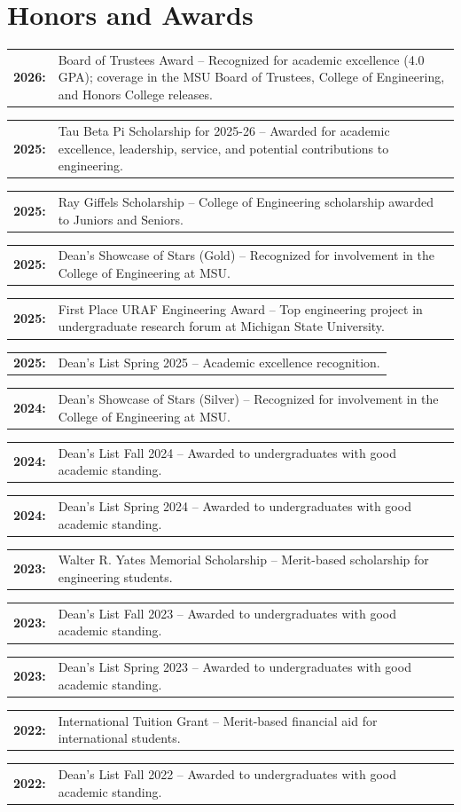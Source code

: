 \section{Honors and Awards}

\newcommand{\awardentry}[3]{%
    \begin{tabularx}{\textwidth}{@{}p{1.2cm}X@{}}
        \textbf{#1:} & #2 -- #3 \\
    \end{tabularx}
    \vspace{2pt}
}

\awardentry{2026}{Board of Trustees Award}{Recognized for academic excellence (4.0 GPA); coverage in the MSU Board of Trustees, College of Engineering, and Honors College releases.}
\awardentry{2025}{Tau Beta Pi Scholarship for 2025-26}{Awarded for academic excellence, leadership, service, and potential contributions to engineering.}
\awardentry{2025}{Ray Giffels Scholarship}{College of Engineering scholarship awarded to Juniors and Seniors.}
\awardentry{2025}{Dean's Showcase of Stars (Gold)}{Recognized for involvement in the College of Engineering at MSU.}
\awardentry{2025}{First Place URAF Engineering Award}{Top engineering project in undergraduate research forum at Michigan State University.}
\awardentry{2025}{Dean's List Spring 2025}{Academic excellence recognition.}
\awardentry{2024}{Dean's Showcase of Stars (Silver)}{Recognized for involvement in the College of Engineering at MSU.}
\awardentry{2024}{Dean's List Fall 2024}{Awarded to undergraduates with good academic standing.}
\awardentry{2024}{Dean's List Spring 2024}{Awarded to undergraduates with good academic standing.}
\awardentry{2023}{Walter R. Yates Memorial Scholarship}{Merit-based scholarship for engineering students.}
\awardentry{2023}{Dean's List Fall 2023}{Awarded to undergraduates with good academic standing.}
\awardentry{2023}{Dean's List Spring 2023}{Awarded to undergraduates with good academic standing.}
\awardentry{2022}{International Tuition Grant}{Merit-based financial aid for international students.}
\awardentry{2022}{Dean's List Fall 2022}{Awarded to undergraduates with good academic standing.}
